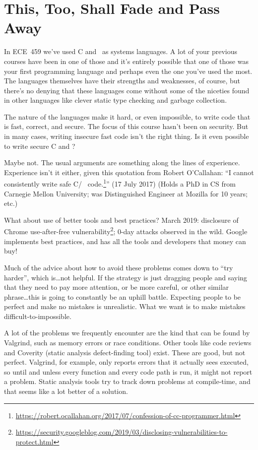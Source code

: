 




\section*{This, Too, Shall Fade and Pass Away}
In ECE~459 we've used C and \CPP~as systems languages. A lot of your previous courses have been in one of those and it's entirely possible that one of those was your first programming language and perhaps even the one you've used the most. The languages themselves have their strengths and weaknesses, of course, but there's no denying that these languages come without some of the niceties found in other languages like clever static type checking and garbage collection.


The nature of the languages make it hard, or even impossible, to write code that is fast, correct, and secure. The focus of this course hasn't been on security. But in many cases, writing insecure fast code isn't the right thing. Is it even possible to write secure C and \CPP?

Maybe not. The usual arguments are something along the lines of experience. Experience isn't it either, given this quotation from Robert O'Callahan: ``I cannot consistently write safe C/\CPP~ code.\footnote{\url{https://robert.ocallahan.org/2017/07/confession-of-cc-programmer.html}}'' (17 July 2017) (Holds a PhD in CS from Carnegie Mellon University; was Distinguished Engineer at Mozilla for 10 years; etc.)

What about use of better tools and best practices? March 2019: disclosure of Chrome use-after-free vulnerability\footnote{\url{https://security.googleblog.com/2019/03/disclosing-vulnerabilities-to-protect.html}}; 0-day attacks
observed in the wild. Google implements best practices, and has all the tools and developers that
money can buy!

Much of the advice about how to avoid these problems comes down to ``try harder'', which is\ldots not helpful. If the strategy is just dragging people and saying that they need to pay more attention, or be more careful, or other similar phrase\ldots this is going to constantly be an uphill battle. Expecting people to be perfect and make no mistakes is unrealistic. What we want is to make mistakes difficult-to-impossible.

A lot of the problems we frequently encounter are the kind that can be found by Valgrind, such as memory errors or race conditions. Other tools like code reviews and Coverity (static analysis defect-finding tool) exist. These are good, but not perfect. Valgrind, for example, only reports errors that it actually sees executed, so until and unless every function and every code path is run, it might not report a problem. Static analysis tools try to track down problems at compile-time, and that seems like a lot better of a solution.


